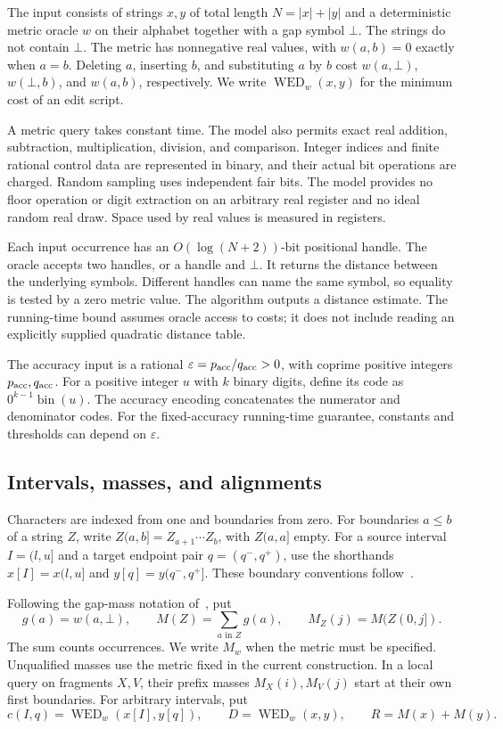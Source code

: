\documentclass[11pt]{article}
\theoremstyle{definition}
\newcommand{\WED}{\operatorname{WED}}
\newcommand{\gap}{\bot}
\newcommand{\1}{\mathbf 1}
\begin{document}
The input consists of strings $x,y$ of total length $N=|x|+|y|$
and a deterministic metric oracle $w$ on their alphabet together with
a gap symbol $\gap$. The strings do not contain $\gap$.
The metric has nonnegative real values, with $w(a,b)=0$ exactly when $a=b$.
Deleting $a$, inserting $b$, and substituting $a$ by $b$ cost
$w(a,\gap)$, $w(\gap,b)$, and $w(a,b)$, respectively.
We write $\WED_w(x,y)$ for the minimum cost of an edit script.

A metric query takes constant time. The model also permits exact real
addition, subtraction, multiplication, division, and comparison.
Integer indices and finite rational control data are represented in
binary, and their actual bit operations are charged.
Random sampling uses independent fair bits.
The model provides no floor operation or digit extraction on an
arbitrary real register and no ideal random real draw.
Space used by real values is measured in registers.

Each input occurrence has an $O(\log(N+2))$-bit positional handle.
The oracle accepts two handles, or a handle and $\gap$.
It returns the distance between the underlying symbols.
Different handles can name the same symbol, so equality is tested
by a zero metric value.
The algorithm outputs a distance estimate.
The running-time bound assumes oracle access to costs; it does not
include reading an explicitly supplied quadratic distance table.

The accuracy input is a rational
$\varepsilon=p_{\rm acc}/q_{\rm acc}>0$, with coprime positive integers
$p_{\rm acc},q_{\rm acc}$.
For a positive integer $u$ with $k$ binary digits, define its code as
$0^{k-1}\operatorname{bin}(u)$.
The accuracy encoding concatenates the numerator and denominator codes.
For the fixed-accuracy running-time guarantee, constants and thresholds
can depend on $\varepsilon$.

\subsection{Intervals, masses, and alignments}

Characters are indexed from one and boundaries from zero.
For boundaries $a\le b$ of a string $Z$, write
$Z(a,b]=Z_{a+1}\cdots Z_b$, with $Z(a,a]$ empty.
For a source interval $I=(l,u]$ and a target endpoint pair
$q=(q^-,q^+)$, use the shorthands $x[I]=x(l,u]$ and
$y[q]=y(q^-,q^+]$.
These boundary conventions follow~\cite{openai}.

Following the gap-mass notation of~\cite{mtw}, put
\[
 g(a)=w(a,\gap),\qquad
 M(Z)=\sum_{a\text{ in }Z}g(a),\qquad
 M_Z(j)=M(Z(0,j]).
\]
The sum counts occurrences. We write $M_w$ when the metric must be
specified. Unqualified masses use the metric fixed in the current
construction. In a local query on fragments $X,V$, their prefix masses
$M_X(i),M_V(j)$ start at their own first boundaries.
For arbitrary intervals, put
\[
 c(I,q)=\WED_w(x[I],y[q]),\qquad
 D=\WED_w(x,y),\qquad R=M(x)+M(y).
\]
\end{document}
